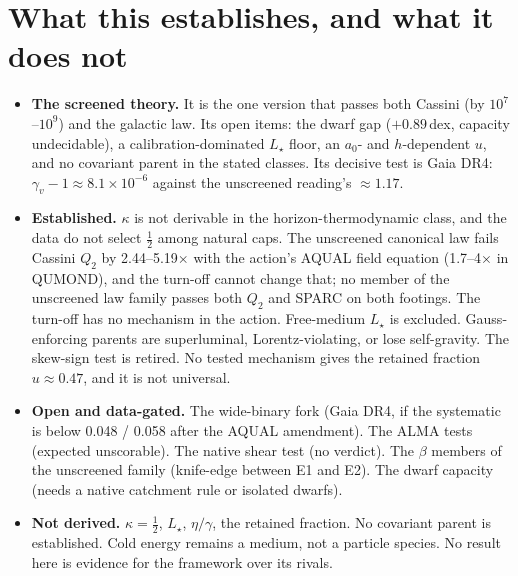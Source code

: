 \documentclass[10pt]{article}
\begin{document}
\section{What this establishes, and what it does not}
\begin{itemize}
\item \textbf{The screened theory.} It is the one version that passes both Cassini (by $10^7$--$10^9$) and the galactic law. Its open items: the dwarf gap ($+0.89$\,dex, capacity undecidable), a calibration-dominated $L_\star$ floor, an $a_0$- and $h$-dependent $u$, and no covariant parent in the stated classes. Its decisive test is Gaia DR4: $\gamma_v-1\approx8.1\times10^{-6}$ against the unscreened reading's $\approx1.17$.
\item \textbf{Established.} $\kappa$ is not derivable in the horizon-thermodynamic class, and the data do not select $\tfrac12$ among natural caps. The unscreened canonical law fails Cassini $Q_2$ by 2.44--5.19$\times$ with the action's AQUAL field equation (1.7--4$\times$ in QUMOND), and the turn-off cannot change that; no member of the unscreened law family passes both $Q_2$ and SPARC on both footings. The turn-off has no mechanism in the action. Free-medium $L_\star$ is excluded. Gauss-enforcing parents are superluminal, Lorentz-violating, or lose self-gravity. The skew-sign test is retired. No tested mechanism gives the retained fraction $u\approx0.47$, and it is not universal.
\item \textbf{Open and data-gated.} The wide-binary fork (Gaia DR4, if the systematic is below 0.048 / 0.058 after the AQUAL amendment). The ALMA tests (expected unscorable). The native shear test (no verdict). The $\beta$ members of the unscreened family (knife-edge between E1 and E2). The dwarf capacity (needs a native catchment rule or isolated dwarfs).
\item \textbf{Not derived.} $\kappa=\tfrac12$, $L_\star$, $\eta/\gamma$, the retained fraction. No covariant parent is established. Cold energy remains a medium, not a particle species. No result here is evidence for the framework over its rivals.
\end{itemize}
\end{document}
